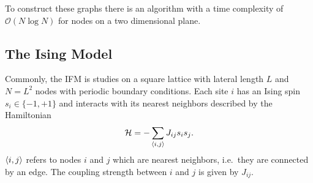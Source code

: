     To construct these graphs there is an algorithm\cite{RNGCell} with
    a time complexity of \(\mathcal{O}(N \log N)\) for nodes on a two
    dimensional plane.

\subsection{The Ising Model}
\label{ssec:model}
    Commonly, the IFM is studies on a square lattice with lateral length
    \(L\) and \(N=L^2\) nodes with periodic boundary conditions.
    Each site $i$ has an Ising spin \(s_i \in \{-1,+1\}\) and interacts with its
    nearest neighbors described by the Hamiltonian
    \begin{equation}
        \mathcal{H} = - \sum_{\left< i,j \right>}J_{ij}s_{i}s_{j}.
        \label{eq:hamiltonian}
    \end{equation}
    \(\left< i,j \right>\) refers to nodes \(i\) and \(j\) which are
    nearest neighbors, i.e.~they are connected by an edge.
    The coupling strength between \(i\) and \(j\) is given by
    \(J_{ij}\).


